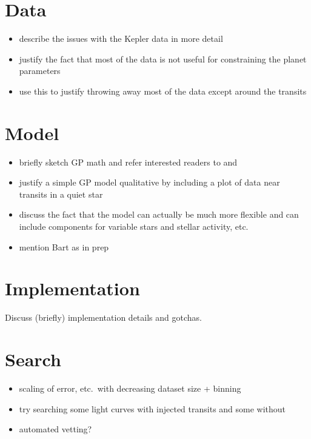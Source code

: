 \documentclass[preprint,12pt]{aastex}
\begin{document}
\section{Data}

\begin{itemize}

\item{describe the issues with the Kepler data in more detail}
\item{justify the fact that most of the data is not useful for constraining
the planet parameters}
\item{use this to justify throwing away most of the data except around the
transits}

\end{itemize}

\section{Model}

\begin{itemize}

\item{briefly sketch GP math and refer interested readers to
\citet{bishop-book} and \citet{gibson-gp}}
\item{justify a simple GP model qualitative by including a plot of data near
transits in a quiet star}
\item{discuss the fact that the model can actually be much more flexible and
can include components for variable stars and stellar activity, etc.}
\item{mention Bart as in prep}

\end{itemize}

\section{Implementation}

Discuss (briefly) implementation details and gotchas.

\section{Search}

\begin{itemize}

\item{scaling of error, etc.\ with decreasing dataset size + binning}
\item{try searching some light curves with injected transits and some without}
\item{automated vetting?}

\end{itemize}
\end{document}
